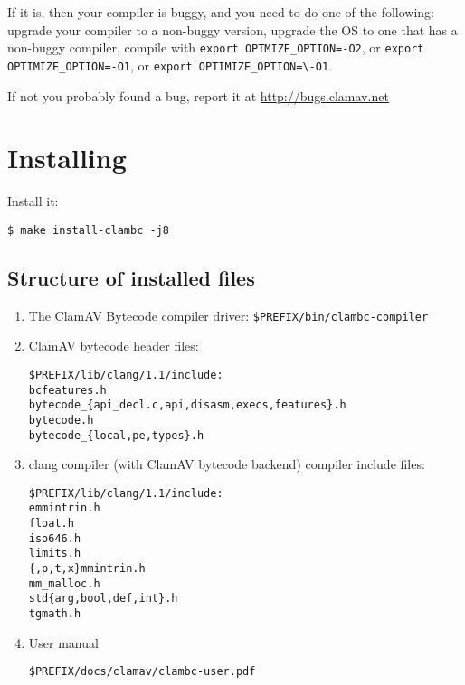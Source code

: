 If it is, then your compiler is buggy, and you need to do one of the following: upgrade your compiler
to a non-buggy version, upgrade the OS to one that has a non-buggy compiler, compile with \verb|export OPTMIZE_OPTION=-O2|, or
\verb|export OPTIMIZE_OPTION=-O1|, or \verb|export OPTIMIZE_OPTION=\-O1|.

If not you probably found a bug, report it at \url{http://bugs.clamav.net}

\section{Installing}
Install it:
\begin{verbatim}
$ make install-clambc -j8
\end{verbatim}

\subsection{Structure of installed files}
\begin{enumerate}
\item The ClamAV Bytecode compiler driver:
\verb+$PREFIX/bin/clambc-compiler+
\item  ClamAV bytecode header files:
\begin{verbatim}
$PREFIX/lib/clang/1.1/include:
bcfeatures.h
bytecode_{api_decl.c,api,disasm,execs,features}.h
bytecode.h
bytecode_{local,pe,types}.h
\end{verbatim}
\item clang compiler (with ClamAV bytecode backend) compiler include files:
\begin{verbatim}
$PREFIX/lib/clang/1.1/include:
emmintrin.h
float.h
iso646.h
limits.h
{,p,t,x}mmintrin.h
mm_malloc.h
std{arg,bool,def,int}.h
tgmath.h
\end{verbatim}
\item User manual
\begin{verbatim}
$PREFIX/docs/clamav/clambc-user.pdf
\end{verbatim}
\end{enumerate}

